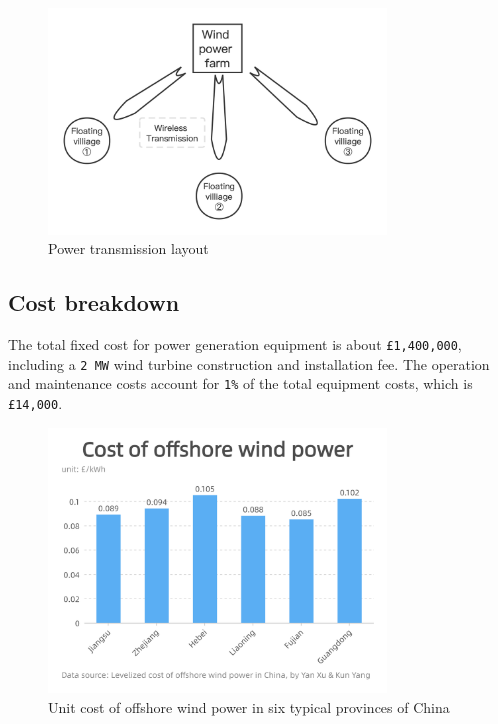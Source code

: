 \documentclass[11pt]{article}
\numberwithin{equation}{section}
\begin{document}
\begin{figure}[H]
\centering
\includegraphics[width=0.8\textwidth]{Figures/powerTransmission.png}
\caption{\label{powerTransmission}Power transmission layout}
\end{figure}

\subsection{Cost breakdown}
\label{sec:org6780c41}
The total fixed cost for power generation equipment is about \texttt{£1,400,000}, including a \texttt{2 MW} wind turbine construction and installation fee. The operation and maintenance costs account for \texttt{1\%} of the total equipment costs, which is \texttt{£14,000}.

\begin{figure}[H]
\centering
\includegraphics[width=0.8\textwidth]{Figures/powerGenerationCost.png}
\caption{\label{powerGenerationCost}Unit cost of offshore wind power in six typical provinces of China}
\end{figure}
\end{document}
